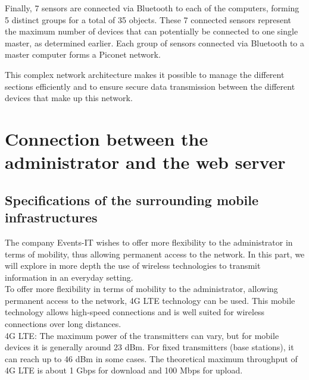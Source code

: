 \documentclass[12]{article}
\begin{document}
Finally, 7 sensors are connected via Bluetooth to each of the computers, forming 5 distinct groups for a total of 35 objects. These 7 connected sensors represent the maximum number of devices that can potentially be connected to one single master, as determined earlier. Each group of sensors connected via Bluetooth to a master computer forms a Piconet network.

This complex network architecture makes it possible to manage the different sections efficiently and to ensure secure data transmission between the different devices that make up this network.



\section{Connection between the administrator and the web server}


\subsection{Specifications of the surrounding mobile infrastructures}

The company Events-IT wishes to offer more flexibility to the administrator in terms of mobility, thus allowing permanent access to the network. In this part, we will explore in more depth the use of wireless technologies to transmit information in an everyday setting. \\

To offer more flexibility in terms of mobility to the administrator, allowing permanent access to the network, 4G LTE technology can be used. This mobile technology allows high-speed connections and is well suited for wireless connections over long distances.\\

4G LTE: The maximum power of the transmitters can vary, but for mobile devices it is generally around 23 dBm. For fixed transmitters (base stations), it can reach up to 46 dBm in some cases. The theoretical maximum throughput of 4G LTE is about 1 Gbps for download and 100 Mbps for upload.
\end{document}

